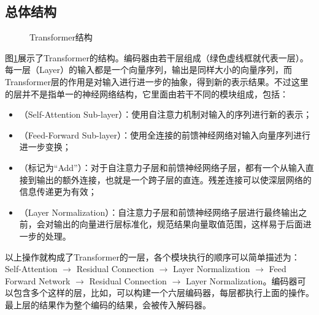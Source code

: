 \subsection{总体结构}
\begin{figure}[htp]
\centering

\caption{ Transformer结构}
\label{fig:12-4}
\end{figure}

\parinterval 图\ref{fig:12-4}展示了Transformer的结构。编码器由若干层组成（绿色虚线框就代表一层）。每一层（Layer）的输入都是一个向量序列，输出是同样大小的向量序列，而Transformer层的作用是对输入进行进一步的抽象，得到新的表示结果。不过这里的层并不是指单一的神经网络结构，它里面由若干不同的模块组成，包括：

\begin{itemize}
\vspace{0.5em}
\item {\small{}}（Self-Attention Sub-layer）：使用自注意力机制对输入的序列进行新的表示；
\vspace{0.5em}
\item {\small{}}（Feed-Forward Sub-layer）：使用全连接的前馈神经网络对输入向量序列进行进一步变换；
\vspace{0.5em}
\item {\small{}}（标记为“Add”）：对于自注意力子层和前馈神经网络子层，都有一个从输入直接到输出的额外连接，也就是一个跨子层的直连。残差连接可以使深层网络的信息传递更为有效；
\vspace{0.5em}
\item {\small{}}（Layer Normalization）：自注意力子层和前馈神经网络子层进行最终输出之前，会对输出的向量进行层标准化，规范结果向量取值范围，这样易于后面进一步的处理。
\vspace{0.5em}
\end{itemize}

\parinterval 以上操作就构成了Transformer的一层，各个模块执行的顺序可以简单描述为：Self-Attention $\to$ Residual Connection $\to$ Layer Normalization $\to$ Feed Forward Network $\to$ Residual Connection $\to$ Layer Normalization。编码器可以包含多个这样的层，比如，可以构建一个六层编码器，每层都执行上面的操作。最上层的结果作为整个编码的结果，会被传入解码器。

